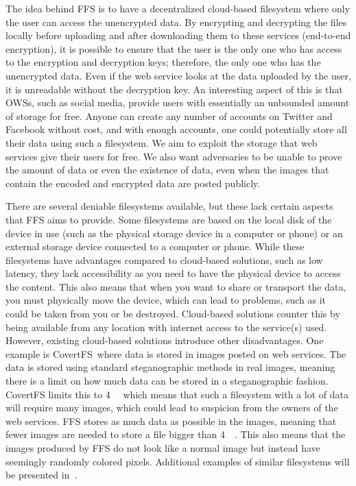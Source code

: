 The idea behind \gls{FFS} is to have a decentralized \mbox{cloud-based} filesystem where only the user can access the unencrypted data. By encrypting and decrypting the files locally before uploading and after downloading them to these services (\mbox{end-to-end} encryption), it is possible to ensure that the user is the only one who has access to the encryption and decryption keys; therefore, the only one who has the unencrypted data. Even if the web service looks at the data uploaded by the user, it is unreadable without the decryption key. An interesting aspect of this is that \glspl{OWS}, such as social media, provide users with essentially an unbounded amount of storage for free. Anyone can create any number of accounts on Twitter and Facebook without cost, and with enough accounts, one could potentially store all their data using such a filesystem. We aim to exploit the storage that web services give their users for free. We also want adversaries to be unable to prove the amount of data or even the existence of data, even when the images that contain the encoded and encrypted data are posted publicly.

There are several deniable filesystems available, but these lack certain aspects that \gls{FFS} aims to provide. Some filesystems are based on the local disk of the device in use (such as the physical storage device in a computer or phone) or an external storage device connected to a computer or phone. While these filesystems have advantages compared to \mbox{cloud-based} solutions, such as low latency, they lack accessibility as you need to have the physical device to access the content. This also means that when you want to share or transport the data, you must physically move the device, which can lead to problems, such as it could be taken from you or be destroyed. \mbox{Cloud-based} solutions counter this by being available from any location with internet access to the service(s) used. However, existing \mbox{cloud-based} solutions introduce other disadvantages. One example is CovertFS\,\cite{baliga2007web} where data is stored in images posted on web services. The data is stored using standard steganographic methods in real images, meaning there is a limit on how much data can be stored in a steganographic fashion. CovertFS limits this to \SI{4}{\kilo\byte} which means that such a filesystem with a lot of data will require many images, which could lead to suspicion from the owners of the web services. \gls{FFS} stores as much data as possible in the images, meaning that fewer images are needed to store a file bigger than \SI{4}{\kilo\byte}. This also means that the images produced by \gls{FFS} do not look like a normal image but instead have seemingly randomly colored pixels. Additional examples of similar filesystems will be presented in~. 